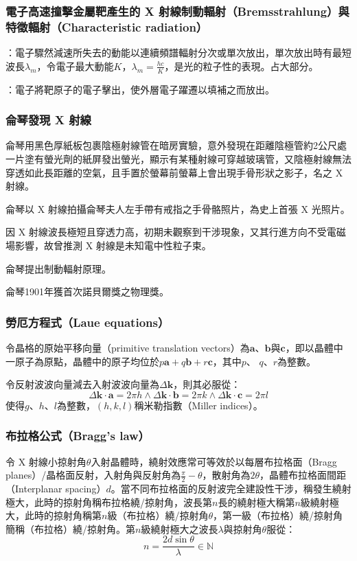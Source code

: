 \documentclass[a4paper,12pt]{article}
\begin{document}
\subsubsection{電子高速撞擊金屬靶產生的 X 射線制動輻射（Bremsstrahlung）與特徵輻射（Characteristic radiation）}
\bit
\item {}：電子驟然減速所失去的動能以連續頻譜輻射分次或單次放出，單次放出時有最短波長$\lambda_m$，令電子最大動能$K$，$\lambda_m=\frac{hc}{K}$，是光的粒子性的表現。占大部分。
\item {}：電子將靶原子的電子擊出，使外層電子躍遷以填補之而放出。
\eit
\subsubsection{侖琴發現 X 射線}
\bit
\item 侖琴用黑色厚紙板包裹陰極射線管在暗房實驗，意外發現在距離陰極管約2公尺處一片塗有螢光劑的紙屏發出螢光，顯示有某種射線可穿越玻璃管，又陰極射線無法穿透如此長距離的空氣，且手置於螢幕前螢幕上會出現手骨形狀之影子，名之 X 射線。
\item 侖琴以 X 射線拍攝侖琴夫人左手帶有戒指之手骨骼照片，為史上首張 X 光照片。
\item 因 X 射線波長極短且穿透力高，初期未觀察到干涉現象，又其行進方向不受電磁場影響，故曾推測 X 射線是未知電中性粒子束。
\item 侖琴提出制動輻射原理。
\item 侖琴1901年獲首次諾貝爾獎之物理獎。
\eit
\subsubsection{勞厄方程式（Laue equations）}
令晶格的原始平移向量（primitive translation vectors）為$\mathbf {a}$、$\mathbf{b}$與$\mathbf {c}$，即以晶體中一原子為原點，晶體中的原子均位於$p\mathbf {a} +q\mathbf {b} +r\mathbf {c} $，其中$p$、 $q$、$r$為整數。

令反射波波向量減去入射波波向量為$\Delta\mathbf{k}$，則其必服從：
\[\Delta\mathbf{k}\cdot\mathbf{a}=2\pi h\land\Delta\mathbf{k}\cdot\mathbf{b}=2\pi k\land\Delta\mathbf{k}\cdot\mathbf{c}=2\pi l\]
使得$g$、$h$、$l$為整數，$(h,k,l)$稱米勒指數（Miller indices）。
\subsubsection{布拉格公式（Bragg's law）}
令 X 射線小掠射角$\theta$入射晶體時，繞射效應常可等效於以每層布拉格面（Bragg planes）/晶格面反射，入射角與反射角為$\frac{\pi}{2}-\theta$，散射角為$2\theta$，晶體布拉格面間距（Interplanar spacing）$d$。當不同布拉格面的反射波完全建設性干涉，稱發生繞射極大，此時的掠射角稱布拉格繞/掠射角，波長第$n$長的繞射極大稱第$n$級繞射極大，此時的掠射角稱第$n$級（布拉格）繞/掠射角$\theta$，第一級（布拉格）繞/掠射角簡稱（布拉格）繞/掠射角。第$n$級繞射極大之波長$\lambda$與掠射角$\theta$服從：
\[n=\frac{2d\sin\theta}{\lambda}\in\mathbb{N}\]
\end{document}
